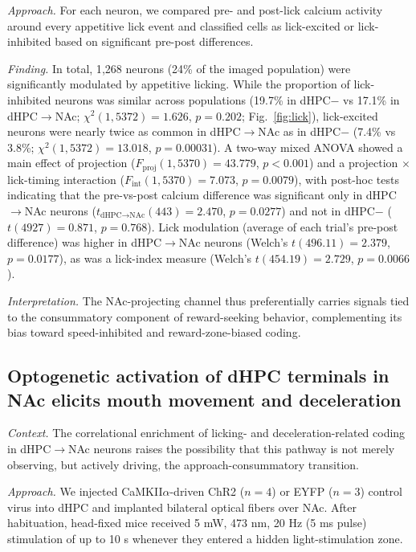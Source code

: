 \documentclass[11pt]{article}
\begin{document}
\textit{Approach.} For each neuron, we compared pre- and post-lick calcium activity around every appetitive lick event and classified cells as lick-excited or lick-inhibited based on significant pre-post differences.

\textit{Finding.} In total, 1{,}268 neurons (24\% of the imaged population) were significantly modulated by appetitive licking. While the proportion of lick-inhibited neurons was similar across populations (19.7\% in dHPC$-$ vs 17.1\% in dHPC$\rightarrow$NAc; $\chi^2(1,5372)=1.626$, $p=0.202$; Fig.~\ref{fig:lick}), lick-excited neurons were nearly twice as common in dHPC$\rightarrow$NAc as in dHPC$-$ (7.4\% vs 3.8\%; $\chi^2(1,5372)=13.018$, $p=0.00031$). A two-way mixed ANOVA showed a main effect of projection ($F_{\text{proj}}(1,5370)=43.779$, $p<0.001$) and a projection $\times$ lick-timing interaction ($F_{\text{int}}(1,5370)=7.073$, $p=0.0079$), with post-hoc tests indicating that the pre-vs-post calcium difference was significant only in dHPC$\rightarrow$NAc neurons ($t_{\text{dHPC}\rightarrow\text{NAc}}(443)=2.470$, $p=0.0277$) and not in dHPC$-$ ($t(4927)=0.871$, $p=0.768$). Lick modulation (average of each trial's pre-post difference) was higher in dHPC$\rightarrow$NAc neurons (Welch's $t(496.11)=2.379$, $p=0.0177$), as was a lick-index measure (Welch's $t(454.19)=2.729$, $p=0.0066$).

\textit{Interpretation.} The NAc-projecting channel thus preferentially carries signals tied to the consummatory component of reward-seeking behavior, complementing its bias toward speed-inhibited and reward-zone-biased coding.

\subsection{Optogenetic activation of dHPC terminals in NAc elicits mouth movement and deceleration}

\textit{Context.} The correlational enrichment of licking- and deceleration-related coding in dHPC$\rightarrow$NAc neurons raises the possibility that this pathway is not merely observing, but actively driving, the approach-consummatory transition.

\textit{Approach.} We injected CaMKII$\alpha$-driven ChR2 ($n=4$) or EYFP ($n=3$) control virus into dHPC and implanted bilateral optical fibers over NAc. After habituation, head-fixed mice received 5 mW, 473 nm, 20 Hz (5 ms pulse) stimulation of up to 10 s whenever they entered a hidden light-stimulation zone.
\end{document}

